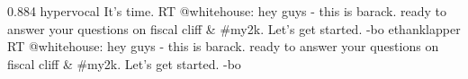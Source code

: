 {0.884}
{\joinNameTweet
{hypervocal}
{It's time. RT @whitehouse: hey guys - this is barack.  ready to answer your questions on fiscal cliff \& \#my2k.  Let's get started. -bo}}
{\joinNameTweet
{ethanklapper}
{RT @whitehouse: hey guys - this is barack.  ready to answer your questions on fiscal cliff \& \#my2k.  Let's get started. -bo}}
%
%
%
%
%
%
%
